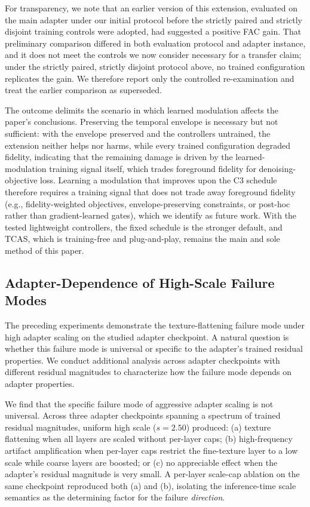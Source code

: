 \documentclass[times,twocolumn,final]{elsarticle}
\begin{document}
For transparency, we note that an earlier version of this extension, evaluated on the main adapter under our initial protocol before the strictly paired and strictly disjoint training controls were adopted, had suggested a positive FAC gain. That preliminary comparison differed in both evaluation protocol and adapter instance, and it does not meet the controls we now consider necessary for a transfer claim; under the strictly paired, strictly disjoint protocol above, no trained configuration replicates the gain. We therefore report only the controlled re-examination and treat the earlier comparison as superseded.

The outcome delimits the scenario in which learned modulation affects the paper's conclusions. Preserving the temporal envelope is necessary but not sufficient: with the envelope preserved and the controllers untrained, the extension neither helps nor harms, while every trained configuration degraded fidelity, indicating that the remaining damage is driven by the learned-modulation training signal itself, which trades foreground fidelity for denoising-objective loss. Learning a modulation that improves upon the C3 schedule therefore requires a training signal that does not trade away foreground fidelity (e.g., fidelity-weighted objectives, envelope-preserving constraints, or post-hoc rather than gradient-learned gates), which we identify as future work. With the tested lightweight controllers, the fixed schedule is the stronger default, and TCAS, which is training-free and plug-and-play, remains the main and sole method of this paper.

\FloatBarrier

\subsection{Adapter-Dependence of High-Scale Failure Modes}
\label{subsec:adapterdep}

The preceding experiments demonstrate the texture-flattening failure mode under high adapter scaling on the studied adapter checkpoint. A natural question is whether this failure mode is universal or specific to the adapter's trained residual properties. We conduct additional analysis across adapter checkpoints with different residual magnitudes to characterize how the failure mode depends on adapter properties.

We find that the specific failure mode of aggressive adapter scaling is not universal. Across three adapter checkpoints spanning a spectrum of trained residual magnitudes, uniform high scale ($s = 2.50$) produced: (a) texture flattening when all layers are scaled without per-layer caps; (b) high-frequency artifact amplification when per-layer caps restrict the fine-texture layer to a low scale while coarse layers are boosted; or (c) no appreciable effect when the adapter's residual magnitude is very small. A per-layer scale-cap ablation on the same checkpoint reproduced both (a) and (b), isolating the inference-time scale semantics as the determining factor for the failure \emph{direction}.
\end{document}
